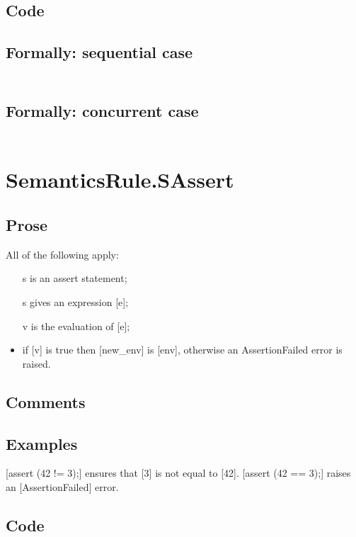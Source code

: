 \documentclass{book}
\begin{document}
  \subsection{Code}

  \subsection{Formally: sequential case}
  \begin{align}
  \end{align} 

  \subsection{Formally: concurrent case}
  \begin{align}
  \end{align} 

\section{SemanticsRule.SAssert \label{sec:SemanticsRule.SAssert}}

    \subsection{Prose}
    All of the following apply:
    \begin{itemize}
    \item [s] is an assert statement;
    \item [s] gives an expression [e];
    \item [v] is the evaluation of [e];
    \item if [v] is true then [new\_env] is [env], otherwise an AssertionFailed
      error is raised.
    \end{itemize}

    \subsection{Comments}

    \subsection{Examples}
    [assert (42 != 3);] ensures that [3] is not equal to [42].
    [assert (42 == 3);] raises an [AssertionFailed] error.

  \subsection{Code}
\end{document}
